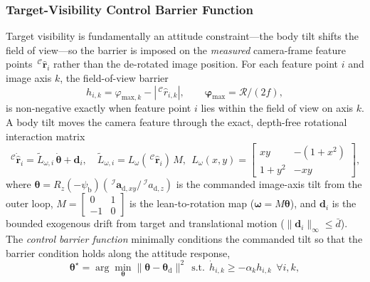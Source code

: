 \documentclass{IEEEtaes}
\begin{document}
\subsubsection{Target-Visibility Control Barrier Function} \label{acceleration conditioning: section}
Target visibility is fundamentally an attitude constraint---the body tilt shifts the field of view---so the barrier is imposed on the \emph{measured} camera-frame feature points $\,^\mathcal{C}\hat{\boldsymbol{r}}_i$ rather than the de-rotated image position. For each feature point $i$ and image axis $k$, the field-of-view barrier
\begin{equation} \label{cbf barrier: equation}
    h_{i,k} = \varphi_{\text{max},k} - |\,^\mathcal{C}\hat{r}_{i,k}|,\qquad \boldsymbol{\varphi}_\text{max}=\mathcal{R}/(2f),
\end{equation}
is non-negative exactly when feature point $i$ lies within the field of view on axis $k$. A body tilt moves the camera feature through the exact, depth-free rotational interaction matrix
\begin{equation} \label{Lw: equation}
    \,^\mathcal{C}\dot{\hat{\boldsymbol{r}}}_i = \tilde{L}_{\omega,i}\,\dot{\boldsymbol{\theta}} + \boldsymbol{d}_i,\quad \tilde{L}_{\omega,i}=L_\omega(\,^\mathcal{C}\hat{\boldsymbol{r}}_i)\,M,\ \ L_\omega(x,y)=\begin{bmatrix} xy & -(1+x^2)\\ 1+y^2 & -xy\end{bmatrix},
\end{equation}
where $\boldsymbol{\theta}=R_z(-\psi_\text{b})(\,^\mathcal{I}\boldsymbol{a}_{\text{d},xy}/\,^\mathcal{I}a_{\text{d},z})$ is the commanded image-axis tilt from the outer loop, $M=[\begin{smallmatrix}0&1\\-1&0\end{smallmatrix}]$ is the lean-to-rotation map ($\boldsymbol{\omega}=M\boldsymbol{\theta}$), and $\boldsymbol{d}_i$ is the bounded exogenous drift from target and translational motion ($\|\boldsymbol{d}_i\|_\infty\le\bar{d}$). The \emph{control barrier function} minimally conditions the commanded tilt so that the barrier condition holds along the attitude response,
\begin{equation} \label{cbf qp: equation}
    \boldsymbol{\theta}^\star=\arg\min_{\boldsymbol{\theta}}\|\boldsymbol{\theta}-\boldsymbol{\theta}_\text{d}\|^2\ \ \text{s.t.}\ \ \dot{h}_{i,k}\ge-\alpha_k h_{i,k}\ \ \forall i,k,
\end{equation}
\end{document}

